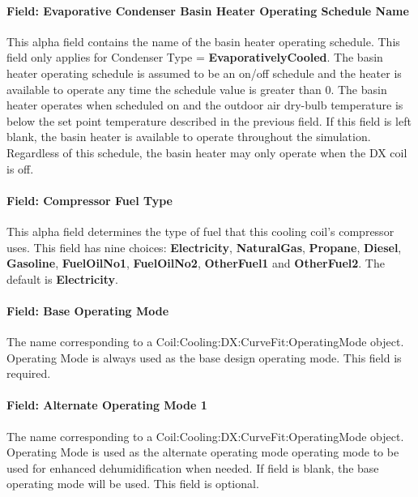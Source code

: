 \paragraph{Field: Evaporative Condenser Basin Heater Operating Schedule Name}\label{field-evaporative-condenser-basin-heater-operating-schedule-name-000}

This alpha field contains the name of the basin heater operating schedule. This field only applies for Condenser Type = \textbf{EvaporativelyCooled}. The basin heater operating schedule is assumed to be an on/off schedule and the heater is available to operate any time the schedule value is greater than 0. The basin heater operates when scheduled on and the outdoor air dry-bulb temperature is below the set point temperature described in the previous field. If this field is left blank, the basin heater is available to operate throughout the simulation. Regardless of this schedule, the basin heater may only operate when the DX coil is off.

\paragraph{Field: Compressor Fuel Type}\label{field-compressor-fuel-type-000}

This alpha field determines the type of fuel that this cooling coil's compressor uses. This field has nine choices: \textbf{Electricity}, \textbf{NaturalGas}, \textbf{Propane}, \textbf{Diesel}, \textbf{Gasoline}, \textbf{FuelOilNo1}, \textbf{FuelOilNo2}, \textbf{OtherFuel1} and \textbf{OtherFuel2}. The default is \textbf{Electricity}.

\paragraph{Field: Base Operating Mode}\label{field-base-operating-mode}

The name corresponding to a Coil:Cooling:DX:CurveFit:OperatingMode object. Operating Mode is always used as the base design operating mode. This field is required.

\paragraph{Field: Alternate Operating Mode 1}\label{field-alternate-operating-mode-1}

The name corresponding to a Coil:Cooling:DX:CurveFit:OperatingMode object. Operating Mode is used as the alternate operating mode operating mode to be used for enhanced dehumidification when needed. If field is blank, the base operating mode will be used. This field is optional.

